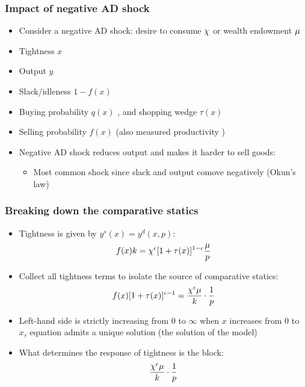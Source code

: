 \documentclass[11pt,aspectratio=169,xcolor={dvipsnames},hyperref={pdftex,pdfpagemode=UseNone,hidelinks,pdfdisplaydoctitle=true},usepdftitle=false]{beamer}
\begin{document}
\begin{frame}
\frametitle{Impact of negative AD shock}
\begin{itemize}
\item Consider a negative AD shock: desire to consume $\chi$ \down or wealth endowment $\mu$ \down
\item Tightness $x$ \down
\item Output $y$ \down
\item Slack/idleness $1-f(x)$ \up
\item Buying probability $q(x)$ \up, and shopping wedge $\tau(x)$ \down
\item Selling probability $f(x)$ \down (also measured productivity \down)
\item Negative AD shock reduces output and makes it harder to sell goods:
\begin{itemize}
 \item Most common shock since slack and output comove negatively (Okun's law)
 \end{itemize}
\end{itemize}	
\end{frame}

\begin{frame}
\end{frame}

\begin{frame}
\frametitle{Breaking down the comparative statics}
\begin{itemize}
\item Tightness is given by $y^s(x) = y^d(x,p)$:
\begin{equation*}
f(x) k = \chi^{\epsilon} [1+\tau(x)]^{1-\epsilon} \frac{\mu}{p}
\end{equation*}
\item Collect all tightness terms to isolate the source of comparative statics:
\begin{equation*}
f(x)  [1+\tau(x)]^{\epsilon-1}= \frac{\chi^{\epsilon} \mu}{k}\cdot \frac{1}{p} 
\end{equation*}
\item Left-hand side is strictly increasing from $0$ to $\infty$ when $x$ increases from $0$ to $x_{\tau}$ \then equation admits a unique solution (the solution of the model)
\item What determines the response of tightness is the block:
\begin{equation*}
\frac{\chi^{\epsilon} \mu}{k}\cdot \frac{1}{p}
\end{equation*}
\end{itemize}	
\end{frame}
\end{document}
